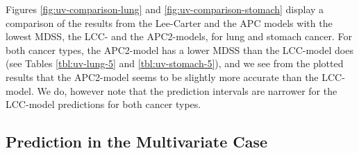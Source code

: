 \newpar Figures \ref{fig:uv-comparison-lung} and \ref{fig:uv-comparison-stomach} display a comparison of the results from the Lee-Carter and the APC models with the lowest MDSS, the LCC- and the APC2-models, for lung and stomach cancer. For both cancer types, the APC2-model has a lower MDSS than the LCC-model does (see Tables \ref{tbl:uv-lung-5} and \ref{tbl:uv-stomach-5}), and we see from the plotted results that the APC2-model seems to be slightly more accurate than the LCC-model. We do, however note that the prediction intervals are narrower for the LCC-model predictions for both cancer types.

\newpage
\subsection{Prediction in the Multivariate Case}
\label{sec:pred-mv}

